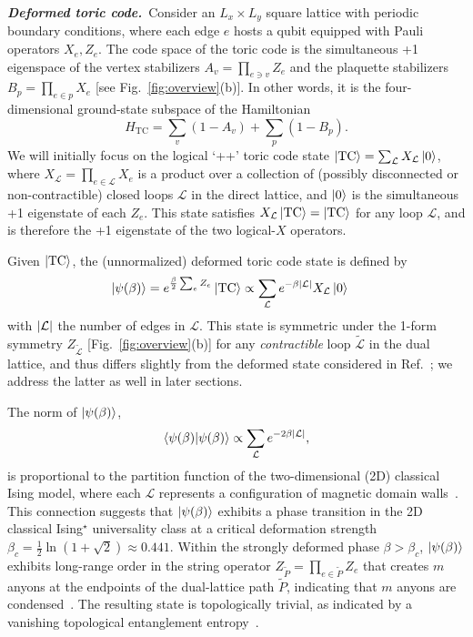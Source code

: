 \documentclass[aps,prl,twocolumn,floatfix,nofootinbib]{revtex4-2}
\theoremstyle{definition}
\newcommand{\TC}{\text{TC}}
\newcommand{\cL}{\mathcal{L}}
\begin{document}
{\bf \emph{Deformed toric code.}}~Consider an $L_x \times L_y$ square lattice with periodic boundary conditions, where each edge $e$ hosts a qubit equipped with Pauli operators $X_e,Z_e$. The code space of the toric code is the simultaneous +1 eigenspace of the vertex stabilizers $A_v = \prod_{e \ni v} Z_e$ and the plaquette stabilizers $B_p = \prod_{e \in p} X_e$ [see Fig.~\ref{fig:overview}(b)]. In other words, it is the four-dimensional ground-state subspace of the Hamiltonian \cite{kitaev_fault-tolerant_2003}
\begin{equation} \label{eqn:H0TC}
    H_{\TC} = \sum_v(1-A_v) +\sum_p(1- B_p).
\end{equation}
We will initially focus on the logical `++' toric code state $\ket{\TC} = \sum_{\mathcal{L}} X_{\mathcal{L}} \ket{0}$, where $X_{\mathcal{L}} = \prod_{e \in \mathcal{L}} X_e$ is a product over a collection of (possibly disconnected or non-contractible) closed loops $\mathcal{L}$ in the direct lattice, and $\ket{0}$ is the simultaneous +1 eigenstate of each $Z_e$. This state satisfies $X_{\mathcal{L}} \ket{\TC} =  \ket{\TC}$ for any loop $\mathcal{L}$, and is therefore the +1 eigenstate of the two logical-$X$ operators.


Given $\ket{\TC}$, the (unnormalized) deformed toric code state is defined by \cite{CastelnovoChamon2007DefToricCode}
\begin{align} \label{eqn:defnofdefTC}
    \ket{\psi(\beta)} &=  e^{\frac{\beta}{2}\sum_e Z_e}\ket{\TC} \propto 
    \sum_{\cL} e^{-\beta \abs{\cL}} X_{\cL}\ket{0}
\end{align}
with $\abs{\cL}$ the number of edges in $\cL$. This state is symmetric under the 1-form symmetry $Z_{\tilde{\mathcal{L}}}$ [Fig.~\ref{fig:overview}(b)] for any \emph{contractible} loop $\tilde{\mathcal{L}}$ in the dual lattice, and thus differs slightly from the deformed state considered in Ref.~; we address the latter as well in later sections. 

The norm of $\ket{\psi(\beta)}$, 
\begin{align} \label{eqn:partition_function}
    \braket{\psi(\beta)}{\psi(\beta)} \propto \sum_{\cL} e^{-2 \beta \abs{\cL}},
\end{align}
is proportional to the partition function of the two-dimensional (2D) classical Ising model, where each $\mathcal{L}$ represents a configuration of magnetic domain walls~\cite{fn1}. This connection suggests that $\ket{\psi(\beta)}$ exhibits a phase transition in the 2D classical Ising$^\star$ universality class at a critical deformation strength $\beta_c = \frac{1}{2}\ln(1 + \sqrt{2}) \approx 0.441$. 
Within the strongly deformed phase $\beta > \beta_c$, $\ket{\psi(\beta)}$ exhibits long-range order in the string operator $Z_{\tilde P} =\prod_{e \in {\tilde P}} Z_e$ that creates $m$ anyons at the endpoints of the dual-lattice path ${\tilde P}$,
indicating that $m$ anyons are condensed~\cite{Burnell_anyon_2018}. The resulting state is topologically trivial, as indicated by a vanishing topological entanglement entropy~\cite{CastelnovoChamon2007DefToricCode, LevinWen2006, KitaevPreskill2006}. 
\end{document}
